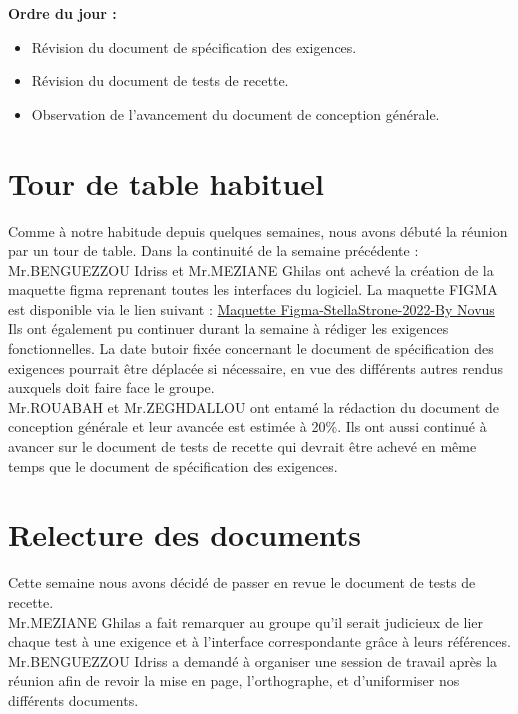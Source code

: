 \documentclass[a4paper, 12pt]{article}
\begin{document}
\textbf{Ordre du jour :}

\begin{itemize}
    \item Révision du document de spécification des exigences.
    \item Révision du document de tests de recette.
    \item Observation de l'avancement du document de conception générale.
\end{itemize}

\section{Tour de table habituel}
Comme à notre habitude depuis quelques semaines, nous avons débuté la réunion par un tour de table. Dans la continuité de la semaine précédente : \\

Mr.BENGUEZZOU Idriss et Mr.MEZIANE Ghilas ont achevé la création de la maquette figma reprenant toutes les interfaces du logiciel. La maquette FIGMA est disponible via le lien suivant : \href{https://www.figma.com/community/file/1176242003132049526}{Maquette Figma-StellaStrone-2022-By Novus} \\
Ils ont également pu continuer durant la semaine à rédiger les exigences fonctionnelles. La date butoir fixée concernant le document de spécification des exigences pourrait être déplacée si nécessaire, en vue des différents autres rendus auxquels doit faire face le groupe. \\
Mr.ROUABAH et Mr.ZEGHDALLOU ont entamé la rédaction du document de conception générale et leur avancée est estimée à 20\%. Ils ont aussi continué à avancer sur le document de tests de recette qui devrait être achevé en même temps que le document de spécification des exigences.

\section{Relecture des documents}
Cette semaine nous avons décidé de passer en revue le document de tests de recette.\\
Mr.MEZIANE Ghilas a fait remarquer au groupe qu'il serait judicieux de lier chaque test à une exigence et à l'interface correspondante grâce à leurs références. \\
Mr.BENGUEZZOU Idriss a demandé à organiser une session de travail après la réunion afin de revoir la mise en page, l'orthographe, et d'uniformiser nos différents documents.
\end{document}
